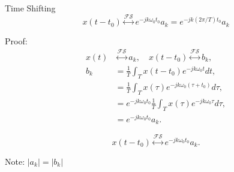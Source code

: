 \begin{frame}[plain]{Time Shifting}
    \begin{equation}
        x(t-t_0) \overset{\mathcal{FS}}{\longleftrightarrow} e^{-jk\omega_0 t_0}a_k = e^{-jk(2\pi/T) t_0}a_k
    \end{equation}
    {
        \noindent Proof:\\%
        \pause
        \begin{equation*}
            \begin{aligned}
          x(t) &\overset{\mathcal{FS}}{\longleftrightarrow} a_k, \quad x(t-t_0) \overset{\mathcal{FS}}{\longleftrightarrow} b_k,\\
                b_k &=  \frac{1}{T}\int_{T}x(t-t_0)e^{-jk\omega_0 t}dt,\\
                &= \frac{1}{T}\int_{T}x(\tau)e^{-jk\omega_0(\tau + t_0)}d\tau,\\
                &= e^{-jk\omega_0  t_0}\frac{1}{T}\int_{T}x(\tau)e^{-jk\omega_0\tau}d\tau,\\
                &= e^{-jk\omega_0  t_0}a_k.
            \end{aligned}
        \end{equation*}

        \begin{equation*}
             x(t-t_0) \overset{\mathcal{FS}}{\longleftrightarrow} e^{-jk\omega_0  t_0}a_k.
        \end{equation*}

        Note: $|a_k| = |b_k|$
    }
\end{frame}


